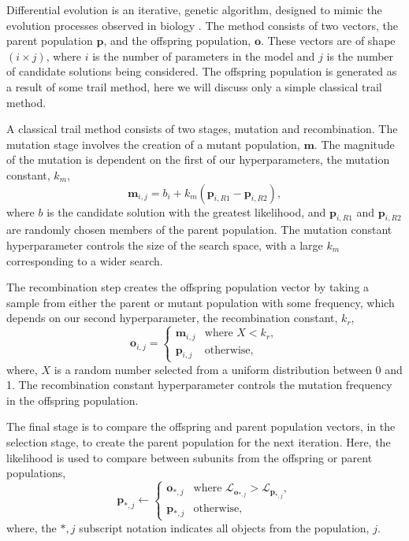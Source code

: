 \documentclass[
 reprint,
 superscriptaddress,
 amsmath,amssymb,
 aps,
]{revtex4-2}
\begin{document}
Differential evolution is an iterative, genetic algorithm, designed to mimic the evolution processes observed in biology \cite{holland_adaptation_1992}.
The method consists of two vectors, the parent population $\mathbf{p}$, and the offspring population, $\mathbf{o}$. 
These vectors are of shape $(i \times j)$, where $i$ is the number of parameters in the model and $j$ is the number of candidate solutions being considered. 
The offspring population is generated as a result of some trail method, here we will discuss only a simple classical trail method.

A classical trail method consists of two stages, mutation and recombination. 
The mutation stage involves the creation of a mutant population, $\mathbf{m}$. 
The magnitude of the mutation is dependent on the first of our hyperparameters, the mutation constant, $k_m$, 
%
\begin{equation}
    \mathbf{m}_{i,j} = b_i + k_m (\mathbf{p}_{i, R1} - \mathbf{p}_{i, R2}),
\end{equation}
%
where $b$ is the candidate solution with the greatest likelihood, and $\mathbf{p}_{i, R1}$ and $\mathbf{p}_{i, R2}$ are randomly chosen members of the parent population. 
The mutation constant hyperparameter controls the size of the search space, with a large $k_m$ corresponding to a wider search. 

The recombination step creates the offspring population vector by taking a sample from either the parent or mutant population with some frequency, which depends on our second hyperparameter, the recombination constant, $k_r$,
%
\begin{equation}
    \mathbf{o}_{i, j} = 
    \begin{cases}
        \mathbf{m}_{i, j} & \text{where } X < k_r,\\
        \mathbf{p}_{i, j} & \text{otherwise},
    \end{cases}
\end{equation}
%
where, $X$ is a random number selected from a uniform distribution between 0 and 1. 
The recombination constant hyperparameter controls the mutation frequency in the offspring population. 

The final stage is to compare the offspring and parent population vectors, in the selection stage, to create the parent population for the next iteration. 
Here, the likelihood is used to compare between subunits from the offspring or parent populations, 
%
\begin{equation}
    \mathbf{p}_{*, j} \leftarrow 
    \begin{cases}
        \mathbf{o}_{*, j} & \text{where } \mathcal{L}_{\mathbf{o}_{*, j}} > \mathcal{L}_{\mathbf{p}_{*, j}},\\
        \mathbf{p}_{*, j} & \text{otherwise},
    \end{cases}
\end{equation}
%
where, the $*, j$ subscript notation indicates all objects from the population, $j$.
\end{document}
